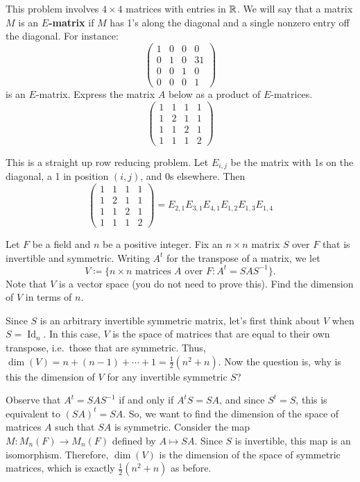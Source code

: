 \begin{question}[subtitle = August 2019 Problem 4,ID=Aug19_4]
This problem involves $4 \times 4$ matrices with entries in $\mathbb{R}$. We will say that a matrix $M$ is an \textbf{$E$-matrix} if $M$ has 1's along the diagonal and a single nonzero entry off the diagonal. For instance:
\[\begin{pmatrix}1&0&0&0\\0&1&0&31\\0&0&1&0\\0&0&0&1\end{pmatrix}\]
is an $E$-matrix. Express the matrix $A$ below as a product of $E$-matrices.
\[\begin{pmatrix}1&1&1&1\\1&2&1&1\\1&1&2&1\\1&1&1&2\end{pmatrix}\]
\end{question}
\begin{solution}
This is a straight up row reducing problem. Let $E_{i,j}$ be the matrix with 1s on the diagonal, a 1 in position $(i,j)$, and 0s elsewhere. Then
\[\begin{pmatrix}1&1&1&1\\1&2&1&1\\1&1&2&1\\1&1&1&2\end{pmatrix} = E_{2,1} E_{3,1} E_{4,1} E_{1,2} E_{1,3} E_{1,4}\]
\end{solution}

%
\begin{question}[subtitle = January 2019 Problem 5,ID=Jan19_5]
Let $F$ be a field and $n$ be a positive integer. Fix an $n\times n$ matrix $S$ over $F$ that is invertible and symmetric. Writing $A^t$ for the transpose of a matrix, we let
\[V\coloneqq \{n\times n \text{ matrices } A \text{ over } F : A^t=SAS^{-1}\}.\]
Note that $V$ is a vector space (you do not need to prove this). Find the dimension of $V$ in terms of $n$.
\end{question}
\begin{solution}
Since $S$ is an arbitrary invertible symmetric matrix, let's first think about $V$ when $S=\operatorname{Id}_n$. In this case, $V$ is the space of matrices that are equal to their own transpose, i.e.\ those that are symmetric. Thus, $\dim(V) = n + (n-1) + \cdots + 1 = \frac{1}{2}(n^2+n)$. Now the question is, why is this the dimension of $V$ for any invertible symmetric $S$?

Observe that $A^t=SAS^{-1}$ if and only if $A^tS=SA$, and since $S^t=S$, this is equivalent to $(SA)^t=SA$. So, we want to find the dimension of the space of matrices $A$ such that $SA$ is symmetric. Consider the map $M: M_n(F) \to M_n(F)$ defined by $A \mapsto SA$. Since $S$ is invertible, this map is an isomorphism. Therefore, $\dim(V)$ is the dimension of the space of symmetric matrices, which is exactly $\frac{1}{2}(n^2+n)$ as before.
\end{solution}

